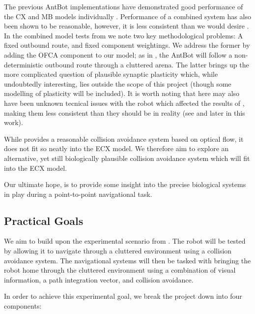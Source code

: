 \documentclass[a4paper,11pt,twoside,openright]{article}
\begin{document}
The previous AntBot implementations have demonstrated good performance of the CX
and MB models individually \cite{Scimeca2017, Mitchell2018}. Performance of
a combined system has also been shown to be reasonable, however, it is less
consistent than we would desire \cite{Zhang2017}. In the combined model tests
from \cite{Zhang2017} we note two key methodological problems: A fixed outbound
route, and fixed component weightings. We address the former by adding the OFCA
component to our model; as in \cite{Mitchell2018}, the AntBot will follow a
non-deterministic outbound route through a cluttered arena. The latter brings up
the more complicated question of plausible synaptic plasticity which, while
undoubtedly interesting, lies outside the scope of this project (though some
modelling of plasticity will be included). It is worth noting that here may also
have been unknown tecnical issues with the robot which affected the results of
\cite{Zhang2017}, making them less consistent than they should be in reality (see
\cite{Mitchell2018} and later in this work).
\newline
\par

While \cite{Mitchell2018} provides a reasonable collision avoidance system
based on optical flow, it does not fit so neatly into the ECX model. We therefore
aim to explore an alternative, yet still biologically plausible collision
avoidance system which will fit into the ECX model.
\newline
\par

Our ultimate hope, is to provide some insight into the precise biological
systems in play during a point-to-point navigational task.

\subsection { Practical Goals }
We aim to build upon the experimental scenario from \cite{Mitchell2018}. The
robot will be tested by allowing it to navigate through a cluttered environment
using a collision avoidance system. The navigational systems will then be
tasked with bringing the robot home through the cluttered environment using
a combination of visual information, a path integration vector, and
collision avoidance.
\newline
\par

In order to achieve this experimental goal, we break the project down
into four components:
\end{document}
